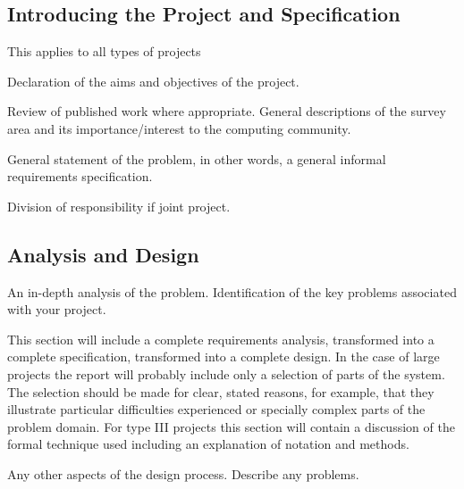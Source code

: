 \documentclass[12]{article}
\begin{document}
\subsection{Introducing the Project and Specification}
This applies to all types of projects 
\begin{list}{}{}
\item Declaration of the aims and objectives of the project. 
\item Review of published work where appropriate.  General descriptions of the survey area and its 
importance/interest to the computing community. 
\item General statement of the problem, in other words, a general informal requirements specification.  
\item Division of responsibility if joint project.
\end{list}
\subsection{Analysis and Design}
\begin{list}{}{}
\item An in-depth analysis of the problem. Identification of the key problems associated with your project.  
\item This section will include a complete requirements analysis, transformed into a complete 
specification, transformed into a complete design. In the case of large projects the report will probably 
include only a selection of parts of the system. The selection should be made for clear, stated reasons, 
for example, that they illustrate particular difficulties experienced or specially complex parts of the 
problem domain. For type III projects this section will contain a discussion of the formal technique 
used including an explanation of notation and methods. 
\item Any other aspects of the design process. Describe any problems.  
\end{list}
\end{document}
